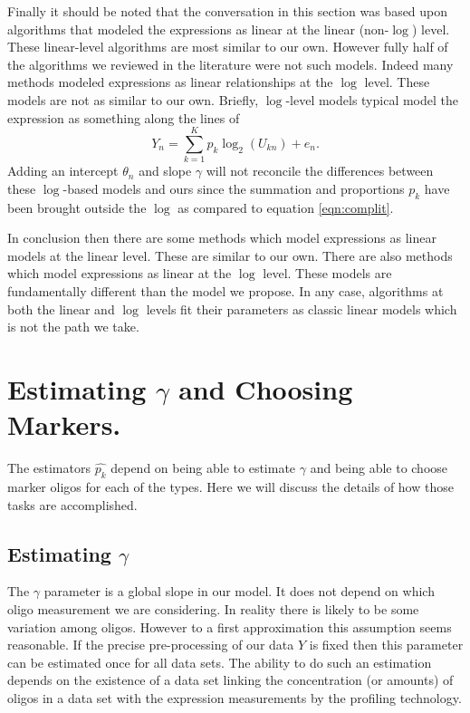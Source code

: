 \documentclass[reqno,12pt,oneside]{report}\usepackage[]{graphicx}\usepackage[]{color}
\theoremstyle{plain}
\theoremstyle{definition}
\theoremstyle{remark}
\numberwithin{theorem}{chapter}     %
\begin{document}
Finally it should be noted that the conversation in this section was based upon algorithms that modeled the expressions as linear at the linear (non-$\log$) level. These linear-level algorithms are most similar to our own. However fully half of the algorithms we reviewed in the literature were not such models. Indeed many methods modeled expressions as linear relationships at the $\log$ level. These models are not as similar to our own. Briefly, $\log$-level models typical model the expression as something along the lines of 
\[
Y_n = \sum_{k=1}^{K}p_k \log_2\left(U_{kn}\right) + e_{n}.
\]
Adding an intercept $\theta_n$ and slope $\gamma$ will not reconcile the differences between these $\log$-based models and ours since the summation and proportions $p_k$ have been brought outside the $\log$ as compared to equation \ref{eqn:complit}.

In conclusion then there are some methods which model expressions as linear models at the linear level. These are similar to our own. There are also methods which model expressions as linear at the $\log$ level. These models are fundamentally different than the model we propose. In any case, algorithms at both the linear and $\log$ levels fit their parameters as classic linear models which is not the path we take.


\section{Estimating $\gamma$ and Choosing Markers.}

The estimators $\widehat{p_k}$ depend on being able to estimate $\gamma$ and being able to choose marker oligos for each of the types. Here we will discuss the details of how those tasks are accomplished. 
  
\subsection{Estimating $\gamma$}

The $\gamma$ parameter is a global slope in our model. It does not depend on which oligo measurement we are considering. In reality there is likely to be some variation among oligos. However to a first approximation this assumption seems reasonable. If the precise pre-processing of our data $Y$ is fixed then this parameter can be estimated once for all data sets. The ability to do such an estimation depends on the existence of a data set linking the concentration (or amounts) of oligos in a data set with the expression measurements by the profiling technology. 
\end{document}
